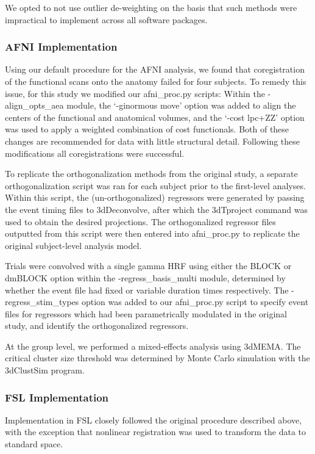 We opted to not use outlier de-weighting on the basis that such methods were impractical to implement across all software packages.

\subsubsection{AFNI Implementation}
Using our default procedure for the AFNI analysis, we found that coregistration of the functional scans onto the anatomy failed for four subjects. To remedy this issue, for this study we modified our afni\_proc.py scripts: Within the -align\_opts\_aea module, the `-ginormous move' option was added to align the centers of the functional and anatomical volumes, and the `-cost lpc+ZZ' option was used to apply a weighted combination of cost functionals. Both of these changes are recommended for data with little structural detail. Following these modifications all coregistrations were successful.

To replicate the orthogonalization methods from the original study, a separate orthogonalization script was ran for each subject prior to the first-level analyses. Within this script, the (un-orthogonalized) regressors were generated by passing the event timing files to 3dDeconvolve, after which the 3dTproject command was used to obtain the desired projections. The orthogonalized regressor files outputted from this script were then entered into afni\_proc.py to replicate the original subject-level analysis model. 

Trials were convolved with a single gamma HRF using either the BLOCK or dmBLOCK option within the -regress\_basis\_multi module, determined by whether the event file had fixed or variable duration times respectively. The -regress\_stim\_types option was added to our afni\_proc.py script to specify event files for regressors which had been parametrically modulated in the original study, and identify the orthogonalized regressors. 

At the group level, we performed a mixed-effects analysis using 3dMEMA. The critical cluster size threshold was determined by Monte Carlo simulation with the 3dClustSim program. 

\subsubsection{FSL Implementation}
Implementation in FSL closely followed the original procedure described above, with the exception that nonlinear registration was used to transform the data to standard space. 

